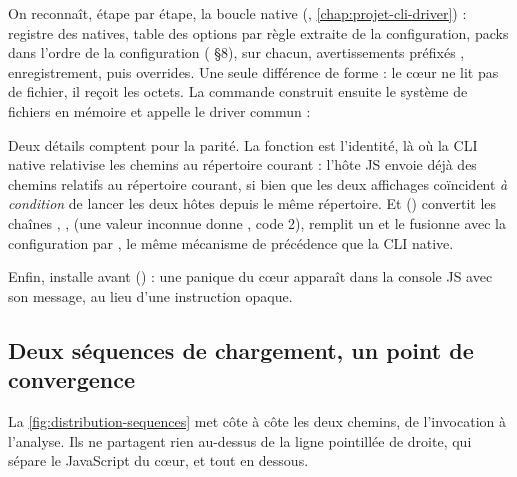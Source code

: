 
On reconnaît, étape par étape, la boucle native (, \cref{chap:projet-cli-driver}) : registre des natives, table des options par règle extraite de la configuration, packs dans l'ordre de la configuration ( §8),  sur chacun, avertissements préfixés , enregistrement, puis overrides. Une seule différence de forme : le cœur ne lit pas de fichier, il reçoit les octets. La commande  construit ensuite le système de fichiers en mémoire et appelle le driver commun :


Deux détails comptent pour la parité. La fonction  est l'identité, là où la CLI native relativise les chemins au répertoire courant : l'hôte JS envoie déjà des chemins relatifs au répertoire courant, si bien que les deux affichages coïncident \emph{à condition} de lancer les deux hôtes depuis le même répertoire. Et  () convertit les chaînes , ,  (une valeur inconnue donne , code 2), remplit un  et le fusionne avec la configuration par , le même mécanisme de précédence que la CLI native.

Enfin,  installe  avant  () : une panique du cœur apparaît dans la console JS avec son message, au lieu d'une instruction  opaque.

\subsection{Deux séquences de chargement, un point de convergence}

La \cref{fig:distribution-sequences} met côte à côte les deux chemins, de l'invocation à l'analyse. Ils ne partagent rien au-dessus de la ligne pointillée de droite, qui sépare le JavaScript du cœur, et tout en dessous.


